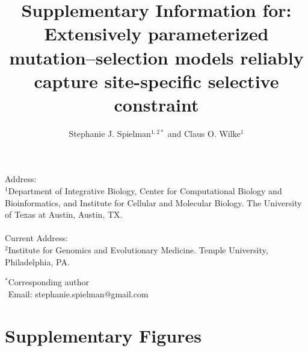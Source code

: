 \documentclass[11pt]{article}
\begin{document}
\title{\textbf{Supplementary Information for:\\ Extensively parameterized mutation--selection models reliably capture site-specific selective constraint}}
\author{Stephanie J. Spielman$^{1,2*}$ and Claus O. Wilke$^{1}$}
\date{}

\maketitle

\noindent
Address:\\
$^1$Department of Integrative Biology, Center for Computational Biology and Bioinformatics, and Institute for Cellular and Molecular Biology. The University of Texas at Austin, Austin, TX.\\\\
Current Address:\\
$^2$Institute for Genomics and Evolutionary Medicine. Temple University, Philadelphia, PA.

\bigskip
\noindent
$^*$Corresponding author\\
$\phantom{^*}$Email: stephanie.spielman@gmail.com\\


\section*{Supplementary Figures}
\end{document}
